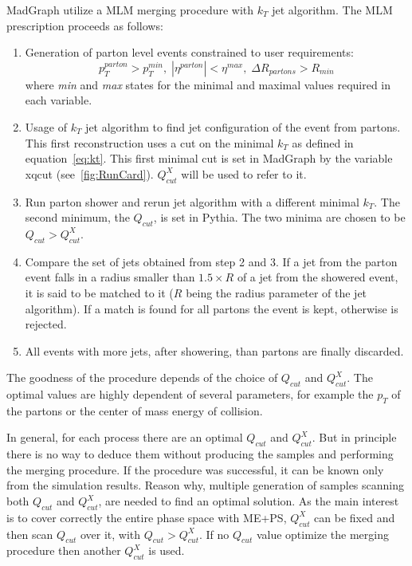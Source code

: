 MadGraph utilize a MLM merging procedure with $k_{T}$ jet algorithm. The MLM prescription proceeds as follows:
\begin{enumerate}
\item Generation of parton level events constrained to user requirements:
  \begin{equation*}
    p_{T}^{parton}>p_{T}^{min}, \; |\eta^{parton}|<\eta^{max}, \; \Delta R_{partons}>R_{min}
  \end{equation*} where \textit{min} and \textit{max} states for the minimal and maximal values required in each variable.
\item Usage of $k_{T}$ jet algorithm to find jet configuration of the event from partons. This first reconstruction uses a cut on the minimal $k_{T}$ as defined in equation~\ref{eq:kt}. This first minimal cut is set in MadGraph by the variable xqcut (see~\ref{fig:RunCard}). $Q^{X}_{cut}$ will be used to refer to it.
\item Run parton shower and rerun jet algorithm with a different minimal $k_{T}$. The second minimum, the $Q_{cut}$, is set in Pythia. The two minima are chosen to be $Q_{cut}>Q^{X}_{cut}$.
\item Compare the set of jets obtained from step 2 and 3. If a jet from the parton event falls in a radius smaller than $1.5 \times R$ of a jet from the showered event, it is said to be matched to it ($R$ being the radius parameter of the jet algorithm). If a match is found for all partons the event is kept, otherwise is rejected.
\item All events with more jets, after showering, than partons are finally discarded.   
\end{enumerate}

The goodness of the procedure depends of the choice of $Q_{cut}$ and $Q^{X}_{cut}$. The optimal values are highly dependent of several parameters, for example the $p_{T}$ of the partons or the center of mass energy of collision. 

In general, for each process there are an optimal $Q_{cut}$ and $Q^{X}_{cut}$. But in principle there is no way to deduce them without producing the samples and performing the merging procedure. If the procedure was successful, it can be known only from the simulation results. Reason why, multiple generation of samples scanning both $Q_{cut}$ and $Q^{X}_{cut}$, are needed to find an optimal solution. As the main interest is to cover correctly the entire phase space with ME+PS, $Q^{X}_{cut}$ can be fixed and then scan $Q_{cut}$ over it, with $Q_{cut}>Q^{X}_{cut}$. If no $Q_{cut}$ value optimize the merging procedure then another $Q^{X}_{cut}$ is used. 

